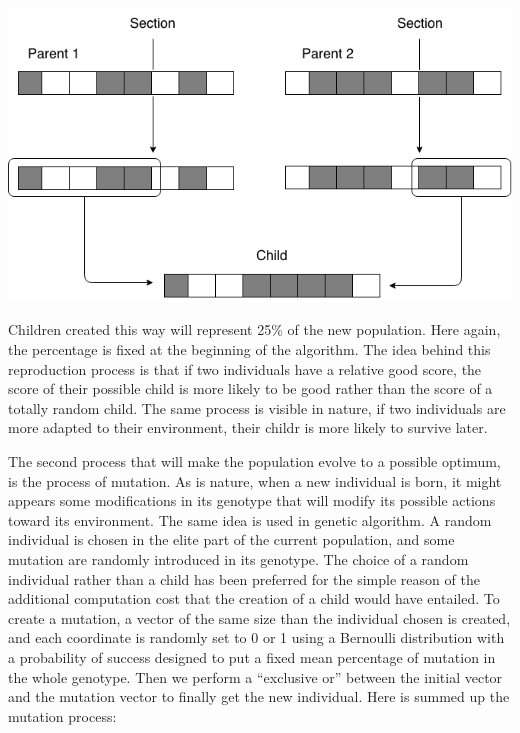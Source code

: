 \documentclass{report}
\begin{document}
	\vspace{1cm}
	\begin{center}
		\includegraphics[scale=0.45]{ressources/ag1}
	\end{center}
	
	\vspace{1cm}
	Children created this way will represent 25\% of the new population. Here again, the percentage is fixed at the beginning of the algorithm. The idea behind this reproduction process is that if two individuals have a relative good score, the score of their possible child is more likely to be good rather than the score of a totally random child. The same process is visible in nature, if two individuals are more adapted to their environment, their childr is more likely to survive later.
	
	The second process that will make the population evolve to a possible optimum, is the process of mutation. As is nature, when a new individual is born, it might appears some modifications in its genotype that will modify its possible actions toward its environment. The same idea is used in genetic algorithm. A random individual is chosen in the elite part of the current population, and some mutation are randomly introduced in its genotype. The choice of a random individual rather than a child has been preferred for the simple reason of the additional computation cost that the creation of a child would have entailed. To create a mutation, a vector of the same size than the individual chosen is created, and each coordinate is randomly set to 0 or 1 using a Bernoulli distribution with a probability of success designed to put a fixed mean percentage of mutation in the whole genotype. Then we perform a “exclusive or” between the initial vector and the mutation vector to finally get the new individual. Here is summed up the mutation process:
	
\end{document}
